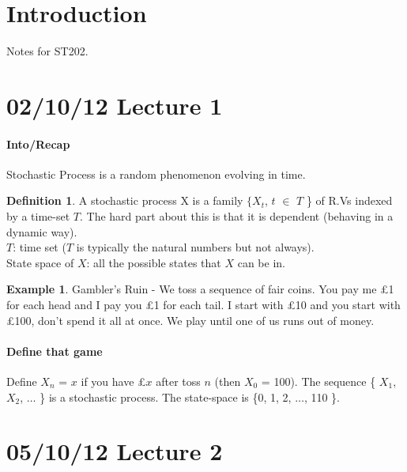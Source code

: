\documentclass{article}
\theoremstyle{definition}
\newtheorem*{defn}{Definition}
\newtheorem*{ex}{Example}
\begin{document}
\maketitle
\tableofcontents

\section{Introduction}
Notes for ST202.
\clearpage

\section*{02/10/12 Lecture 1}

\paragraph*{Into/Recap}

Stochastic Process is a random phenomenon evolving in time.

\begin{defn} A stochastic process X is a family $\{ X_t$, $t$ $\in$ $T$ \} of R.Vs indexed by a time-set $T$. The hard part about this is that it is dependent (behaving in a dynamic way).\\

$T$: time set ($T$ is typically the natural numbers but not always).\\

State space of $X$: all the possible states that $X$ can be in.\\
\end{defn}

\begin{ex}
Gambler's Ruin - We toss a sequence of fair coins. You pay me £1 for each head and I pay you £1 for each tail. I start with £10 and you start with £100, don't spend it all at once. We play until one of us runs out of money.

\paragraph*{Define that game}

Define $X_n$ = $x$ if you have £$x$ after toss $n$ (then $X_0$ = 100). The sequence \{ $X_1$, $X_2$, $\ldots$ \} is a stochastic process. The state-space is \{0, 1, 2, $\ldots$, 110 \}.
\end{ex}

\section*{05/10/12 Lecture 2}
\end{document}
